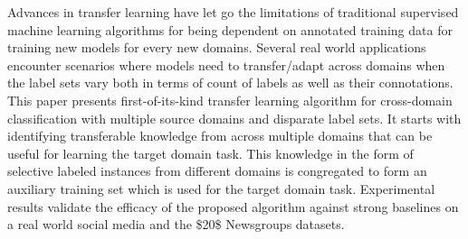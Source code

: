 Advances in transfer learning have let go the limitations of traditional supervised machine learning algorithms for being dependent on annotated training data for training new models for every new domains. Several real world applications encounter scenarios where models need to transfer/adapt across domains when the label sets vary both in terms of count of labels as well as their connotations. This paper presents first-of-its-kind transfer learning algorithm for cross-domain classification with multiple source domains and disparate label sets. It starts with identifying transferable knowledge from across multiple domains that can be useful for learning the target domain task. This knowledge in the form of selective labeled instances from different domains is congregated to form an auxiliary training set which is used for the target domain task. Experimental results validate the efficacy of the proposed algorithm against strong baselines on a real world social media and the \$20\$ Newsgroups datasets.
